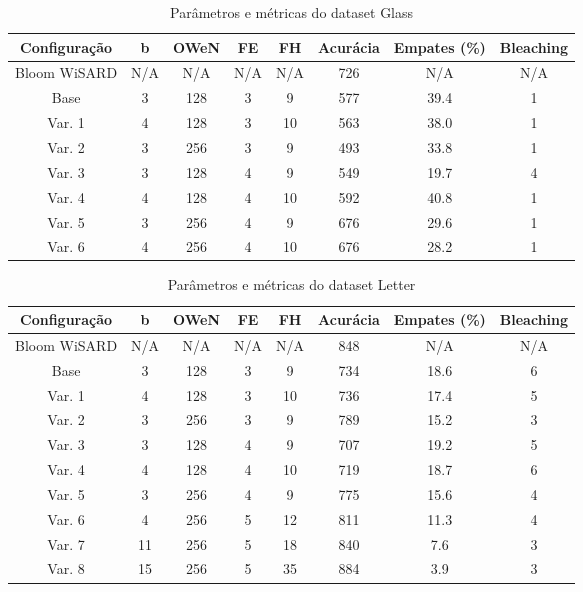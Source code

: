 \documentclass{article}
\begin{document}
{\begin{table}[H]
\caption{Parâmetros e métricas do dataset Glass}
\begin{tabular}{|c|c|c|c|c|c|c|c|}
\hline
\textbf{Configuração} & \textbf{b} & \textbf{OWeN} & \textbf{FE} & \textbf{FH} & \textbf{Acurácia} & \textbf{Empates (\%)} & \textbf{Bleaching} \\
\hline
Bloom WiSARD & N/A & N/A & N/A & N/A & 726 & N/A & N/A \\
\hline
Base & 3 & 128 & 3 & 9 & 577 & 39.4 & 1 \\
\hline
Var. 1 & 4 & 128 & 3 & 10 & 563 & 38.0 & 1 \\
\hline
Var. 2 & 3 & 256 & 3 & 9 & 493 & 33.8 & 1 \\
\hline
Var. 3 & 3 & 128 & 4 & 9 & 549 & 19.7 & 4 \\
\hline
Var. 4 & 4 & 128 & 4 & 10 & 592 & 40.8 & 1 \\
\hline
Var. 5 & 3 & 256 & 4 & 9 & 676 & 29.6 & 1 \\
\hline
Var. 6 & 4 & 256 & 4 & 10 & 676 & 28.2 & 1 \\
\hline
\end{tabular}
\end{table}

\begin{table}[H]
\caption{Parâmetros e métricas do dataset Letter}
\begin{tabular}{|c|c|c|c|c|c|c|c|}
\hline
\textbf{Configuração} & \textbf{b} & \textbf{OWeN} & \textbf{FE} & \textbf{FH} & \textbf{Acurácia} & \textbf{Empates (\%)} & \textbf{Bleaching} \\
\hline
Bloom WiSARD & N/A & N/A & N/A & N/A & 848 & N/A & N/A \\
\hline
Base & 3 & 128 & 3 & 9 & 734 & 18.6 & 6 \\
\hline
Var. 1 & 4 & 128 & 3 & 10 & 736 & 17.4 & 5 \\
\hline
Var. 2 & 3 & 256 & 3 & 9 & 789 & 15.2 & 3 \\
\hline
Var. 3 & 3 & 128 & 4 & 9 & 707 & 19.2 & 5 \\
\hline
Var. 4 & 4 & 128 & 4 & 10 & 719 & 18.7 & 6 \\
\hline
Var. 5 & 3 & 256 & 4 & 9 & 775 & 15.6 & 4 \\
\hline
Var. 6 & 4 & 256 & 5 & 12 & 811 & 11.3 & 4 \\
\hline
Var. 7 & 11 & 256 & 5 & 18 & 840 & 7.6 & 3 \\
\hline
Var. 8 & 15 & 256 & 5 & 35 & 884 & 3.9 & 3 \\
\hline
\end{tabular}
\end{table}

}
\end{document}
